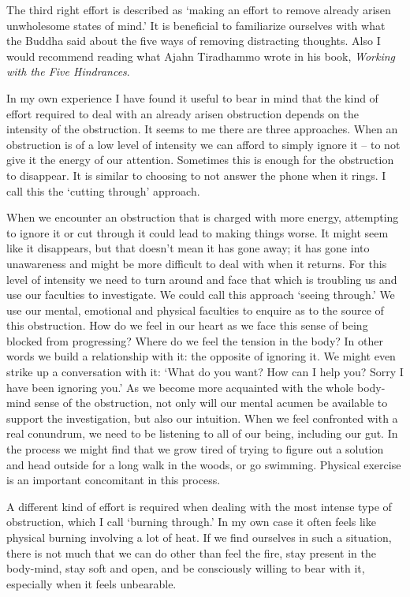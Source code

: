 The third right effort is described as `making an effort to remove
already arisen unwholesome states of mind.' It is beneficial to
familiarize ourselves with what the Buddha said about the five ways of
removing distracting thoughts\cite{thoughts}. Also I would recommend reading what
Ajahn Tiradhammo wrote in his book, \emph{Working with the Five Hindrances}\cite{hindrances}.

In my own experience I have found it useful to bear in mind that the
kind of effort required to deal with an already arisen obstruction
depends on the intensity of the obstruction. It seems to me there are
three approaches. When an obstruction is of a low level of intensity we
can afford to simply ignore it -- to not give it the energy of our
attention. Sometimes this is enough for the obstruction to disappear. It
is similar to choosing to not answer the phone when it rings. I call
this the `cutting through' approach.

When we encounter an obstruction that is charged with more energy,
attempting to ignore it or cut through it could lead to making things
worse. It might seem like it disappears, but that doesn't mean it has
gone away; it has gone into unawareness and might be more difficult to
deal with when it returns. For this level of intensity we need to turn
around and face that which is troubling us and use our faculties to
investigate. We could call this approach `seeing through.' We use our
mental, emotional and physical faculties to enquire as to the source of
this obstruction. How do we feel in our heart as we face this sense of
being blocked from progressing? Where do we feel the tension in the
body? In other words we build a relationship with it: the opposite of
ignoring it. We might even strike up a conversation with it: `What do
you want? How can I help you? Sorry I have been ignoring you.' As we
become more acquainted with the whole body-mind sense of the
obstruction, not only will our mental acumen be available to support the
investigation, but also our intuition. When we feel confronted with a
real conundrum, we need to be listening to all of our being, including
our gut. In the process we might find that we grow tired of trying to
figure out a solution and head outside for a long walk in the woods, or
go swimming. Physical exercise is an important concomitant in this
process.

A different kind of effort is required when dealing with the most
intense type of obstruction, which I call `burning through.' In my own
case it often feels like physical burning involving a lot of heat. If we
find ourselves in such a situation, there is not much that we can do
other than feel the fire, stay present in the body-mind, stay soft and
open, and be consciously willing to bear with it, especially when it
feels unbearable.

